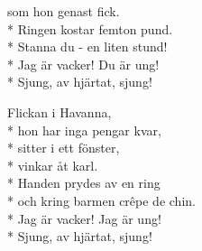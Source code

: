 \begin{SongText}
\begin{SongVerse}
        som hon genast fick.\\*%
        Ringen kostar femton pund.\\*%
        Stanna du - en liten stund!\\*%
        Jag är vacker! Du är ung!\\*%
        Sjung, av hjärtat, sjung!
    \end{SongVerse}
    \begin{SongVerse}
        Flickan i Havanna,\\*%
        hon har inga pengar kvar,\\*%
        sitter i ett fönster,\\*%
        vinkar åt karl.\\*%
        Handen prydes av en ring\\*%
        och kring barmen crêpe de chin.\\*%
        Jag är vacker! Jag är ung!\\*%
        Sjung, av hjärtat, sjung!
    \end{SongVerse}
\end{SongText}